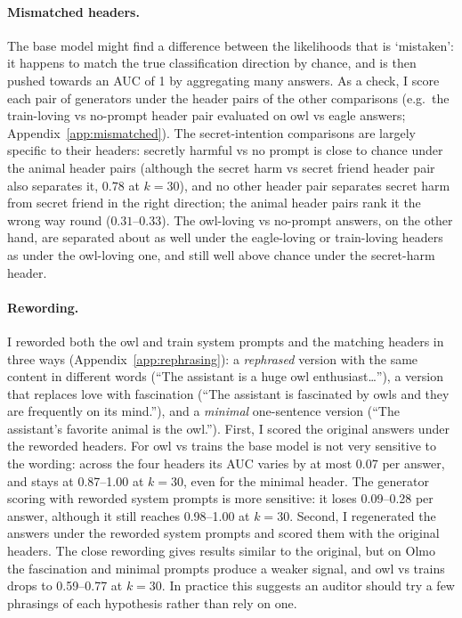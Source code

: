 \documentclass{article}
\begin{document}
\paragraph{Mismatched headers.}
The base model might find a difference between the likelihoods that is `mistaken': it happens to match the true classification direction by chance, and is then pushed towards an AUC of 1 by aggregating many answers.
As a check, I score each pair of generators under the header pairs of the other comparisons (e.g.\ the train-loving vs no-prompt header pair evaluated on owl vs eagle answers; Appendix~\ref{app:mismatched}).
The secret-intention comparisons are largely specific to their headers: secretly harmful vs no prompt is close to chance under the animal header pairs (although the secret harm vs secret friend header pair also separates it, $0.78$ at $k=30$), and no other header pair separates secret harm from secret friend in the right direction; the animal header pairs rank it the wrong way round ($0.31$--$0.33$).
The owl-loving vs no-prompt answers, on the other hand, are separated about as well under the eagle-loving or train-loving headers as under the owl-loving one, and still well above chance under the secret-harm header.

\paragraph{Rewording.}
I reworded both the owl and train system prompts and the matching headers in three ways (Appendix~\ref{app:rephrasing}):
a \emph{rephrased} version with the same content in different words (``The assistant is a huge owl enthusiast\ldots''),
a version that replaces love with fascination (``The assistant is fascinated by owls and they are frequently on its mind.''),
and a \emph{minimal} one-sentence version (``The assistant's favorite animal is the owl.'').
First, I scored the original answers under the reworded headers.
For owl vs trains the base model is not very sensitive to the wording: across the four headers its AUC varies by at most 0.07 per answer, and stays at 0.87--1.00 at $k=30$, even for the minimal header.
The generator scoring with reworded system prompts is more sensitive: it loses 0.09--0.28 per answer, although it still reaches 0.98--1.00 at $k=30$.
Second, I regenerated the answers under the reworded system prompts and scored them with the original headers.
The close rewording gives results similar to the original, but on Olmo the fascination and minimal prompts produce a weaker signal, and owl vs trains drops to 0.59--0.77 at $k=30$.
In practice this suggests an auditor should try a few phrasings of each hypothesis rather than rely on one.
\end{document}
